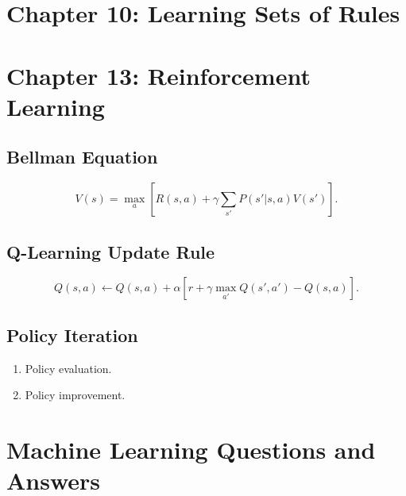 \documentclass[10pt,a4paper]{article}
\begin{document}
\section*{Chapter 10: Learning Sets of Rules}

\section*{Chapter 13: Reinforcement Learning}
\subsection*{Bellman Equation}
\[
V(s) = \max_a \left[ R(s, a) + \gamma \sum_{s'} P(s'|s, a)V(s') \right].
\]

\subsection*{Q-Learning Update Rule}
\[
Q(s, a) \leftarrow Q(s, a) + \alpha \left[ r + \gamma \max_{a'} Q(s', a') - Q(s, a) \right].
\]

\subsection*{Policy Iteration}
\begin{enumerate}
    \item Policy evaluation.
    \item Policy improvement.
\end{enumerate}


\section*{Machine Learning Questions and Answers}
\end{document}
